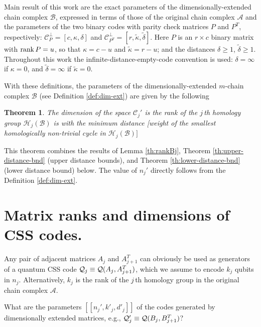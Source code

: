 \documentclass[aps,prb,12pt,tightenlines,%
notitlepage,longbibliography]{revtex4-1}
\newtheorem{theorem}{Theorem}
\begin{document}
Main result of this work are the exact parameters of the
dimensionally-extended chain complex $\mathcal{B}$, expressed in terms
of those of the original chain complex $\mathcal{A}$ and the
parameters of the two binary codes with parity check matrices $P$ and
$P^T$, respectively: $\mathcal{C}_P^\perp=[c,\kappa,\delta]$ and
$\mathcal{C}_{P^T}^\perp=[r,\tilde{\kappa},\tilde{\delta}]$.  Here $P$
is an $r\times c$ binary matrix with $\mathop{\rm rank} P=u$, so that $\kappa=c-u$
and $\tilde{\kappa}=r-u$; and the distances $\delta\ge1$,
$\tilde{\delta}\ge1$.  Throughout this work the
infinite-distance-empty-code convention is used: $\delta=\infty $ if
$\kappa=0$, and $\tilde{\delta}=\infty$ if $\tilde{\kappa}=0$.

With these definitions, the parameters of the dimensionally-extended
$m$-chain complex $\mathcal{B}$ (see Definition \ref{def:dim-ext}) are
given by the following
\begin{theorem}
  \label{th:results}
  The dimension of the space $\mathcal{C}_j'$ is
   the rank of the $j$\,th homology
  group $\mathcal{H}_j(\mathcal{B})$ is
   with the minimum
  distance [weight of the smallest homologically non-trivial cycle in
  $\mathcal{H}_j(\mathcal{B})]$\ \ 
\end{theorem}

This theorem combines the results of Lemma \ref{th:rankBj}, Theorem
\ref{th:upper-distance-bnd} (upper distance bounds), and Theorem
\ref{th:lower-distance-bnd} (lower distance bound) below.  The value
of $n_j'$ directly follows from the Definition \ref{def:dim-ext}.
\section{Matrix ranks and dimensions of CSS codes.}
Any pair of adjacent matrices $A_{j}$ and $A_{j+1}^T$ can obviously be
used as generators of a quantum CSS code
${\cal Q}_j\equiv {\cal Q}(A_{j},A_{j+1}^T)$, which we assume to encode
$k_j$ qubits in $n_j$.  Alternatively, $k_j$ is the rank of the
$j$\,th homology group in the original chain complex $\mathcal{A}$.

What are the parameters $[[n_j',k'_j,d'_j]]$
of the codes generated by dimensionally extended matrices, e.g.,
${\cal Q}_j'\equiv {\cal Q}(B_{j},B_{j+1}^T)$?  
\end{document}
